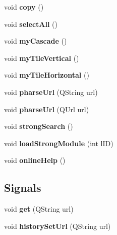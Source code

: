 \begin{CompactItemize}
\item 
\hypertarget{classMainWindow_cf6d6b4fec2a84de7ec6645260c061fa}{
void \textbf{copy} ()}
\label{classMainWindow_cf6d6b4fec2a84de7ec6645260c061fa}

\item 
\hypertarget{classMainWindow_595fd3f60139b137bf8b125d0f87f79f}{
void \textbf{selectAll} ()}
\label{classMainWindow_595fd3f60139b137bf8b125d0f87f79f}

\item 
\hypertarget{classMainWindow_4fb1d7dcc93ff8cdb87933fc7ceaf251}{
void \textbf{myCascade} ()}
\label{classMainWindow_4fb1d7dcc93ff8cdb87933fc7ceaf251}

\item 
\hypertarget{classMainWindow_29d49b5a6d0977c38c182113f2d1669f}{
void \textbf{myTileVertical} ()}
\label{classMainWindow_29d49b5a6d0977c38c182113f2d1669f}

\item 
\hypertarget{classMainWindow_9ca96b3d90663b94be4df76975eee4f7}{
void \textbf{myTileHorizontal} ()}
\label{classMainWindow_9ca96b3d90663b94be4df76975eee4f7}

\item 
\hypertarget{classMainWindow_1963599aca49a9a391a89c506c96ae9d}{
void \textbf{pharseUrl} (QString url)}
\label{classMainWindow_1963599aca49a9a391a89c506c96ae9d}

\item 
\hypertarget{classMainWindow_3de55c1c59fd12b3ec1e93bcd11ef51b}{
void \textbf{pharseUrl} (QUrl url)}
\label{classMainWindow_3de55c1c59fd12b3ec1e93bcd11ef51b}

\item 
\hypertarget{classMainWindow_de61b4596e1fdcdff2d4e1ef8646a322}{
void \textbf{strongSearch} ()}
\label{classMainWindow_de61b4596e1fdcdff2d4e1ef8646a322}

\item 
\hypertarget{classMainWindow_37e6274d105708df54562f2399cee468}{
void \textbf{loadStrongModule} (int lID)}
\label{classMainWindow_37e6274d105708df54562f2399cee468}

\item 
\hypertarget{classMainWindow_f9ebcf31a5ffa11eb84bbeed634805fa}{
void \textbf{onlineHelp} ()}
\label{classMainWindow_f9ebcf31a5ffa11eb84bbeed634805fa}

\end{CompactItemize}
\subsection*{Signals}
\begin{CompactItemize}
\item 
\hypertarget{classMainWindow_d70705f9a55b3c31d1c52b3e642c8c1e}{
void \textbf{get} (QString url)}
\label{classMainWindow_d70705f9a55b3c31d1c52b3e642c8c1e}

\item 
\hypertarget{classMainWindow_8d641e2ddcfceeb1e85d9813c08c0368}{
void \textbf{historySetUrl} (QString url)}
\label{classMainWindow_8d641e2ddcfceeb1e85d9813c08c0368}

\end{CompactItemize}
